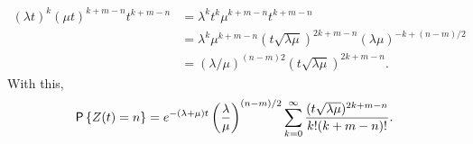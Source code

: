 \begin{exercise}
\begin{solution}
\begin{equation*}
  \begin{split}
  (\lambda t)^k (\mu t) ^{k + m - n} t^{k+m-n} 
&=  \lambda^k t^k\mu^{k + m - n} t^{k+m-n} \\
&= \lambda^k \mu^{k + m - n} (t\sqrt{\lambda \mu})^{2k+m-n} (\lambda\mu)^{-k + (n-m)/2} \\
&= (\lambda/\mu)^{(n-m)2} (t\sqrt{\lambda \mu})^{2k+m-n}.
  \end{split}
\end{equation*}
With this,
\begin{equation*}
    \P{Z(t)=n} 
= e^{-(\lambda+\mu)t} \left(\frac\lambda\mu\right)^{(n-m)/2} \sum_{k=0}^\infty 
\frac{(t\sqrt{\lambda\mu} )^{2k+m-n}}{k!(k+m-n)!}.
\end{equation*}
\end{solution}
\end{exercise}


